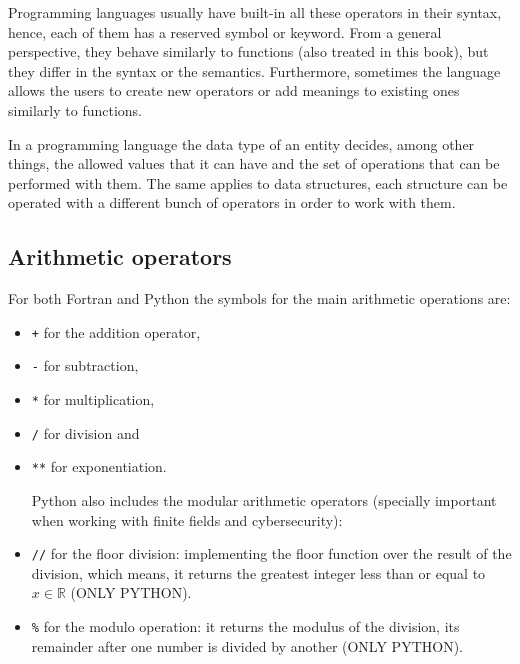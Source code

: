 Programming languages usually have built-in all these operators in their syntax,
hence, each of them has a reserved symbol or keyword.
From a general perspective, 
they behave similarly to functions (also treated in this book), 
but they differ in the syntax or the semantics. 
Furthermore, sometimes the language allows the users to create new operators 
or add meanings to existing ones similarly to functions. 

In a programming language the data type of an entity decides, among other things, 
the allowed values that it can have and 
the set of operations that can be performed with them.
The same applies to data structures, each structure can be operated 
with a different bunch of operators in order to work with them. 

%

        \subsection*{Arithmetic operators}
        
        For both Fortran and Python the symbols for the main arithmetic operations are:
        \vspace{-0.7cm}
        \begin{itemize}[noitemsep]
            \item \texttt{+} for the addition operator, 
            \item \texttt{-} for subtraction,
            \item \texttt{*} for multiplication,
            \item \texttt{/} for division and
            \item \texttt{**} for exponentiation.
            
            \vspace{0.3cm}
            Python also includes the modular arithmetic operators (specially important when working with finite fields and cybersecurity):
            \item \texttt{//} for the floor division: implementing the floor function over the result of the division, which means, it returns the greatest integer less than or equal to $x\in\mathbb{R}$ (ONLY PYTHON).
            \item \texttt{\%} for the modulo operation: it returns the modulus of the division, its remainder after one number is divided by another (ONLY PYTHON).
        \end{itemize}
        
